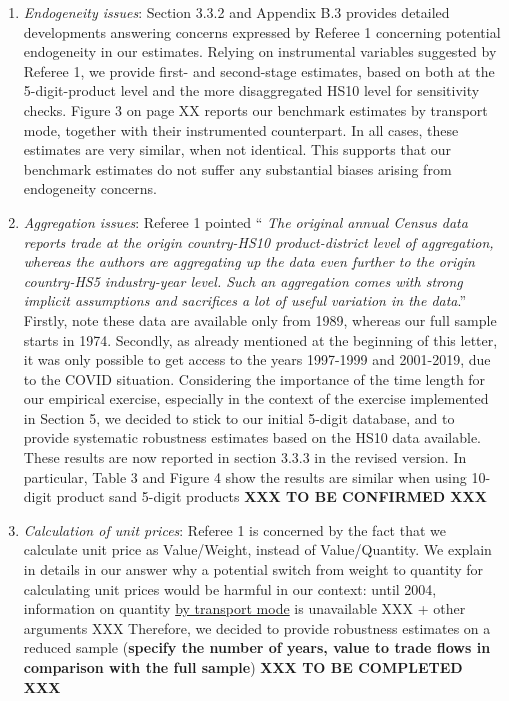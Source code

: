 \documentclass[12pt]{article}
\begin{document}
\begin{enumerate}


\item \emph{Endogeneity issues}: Section 3.3.2 and Appendix B.3 provides detailed developments answering concerns expressed by Referee 1 concerning potential endogeneity in our estimates. Relying on instrumental variables suggested by Referee 1, we provide first- and second-stage estimates, based on both at the 5-digit-product level and the more disaggregated HS10 level for sensitivity checks. Figure 3 on page XX reports our benchmark estimates by transport mode, together with their instrumented counterpart. In all cases, these estimates are very similar, when not identical. This supports that our benchmark estimates do not suffer any substantial biases arising from endogeneity concerns.
    
\item \emph{Aggregation issues}: Referee 1 pointed `` \emph{The original annual Census data reports trade at the origin country-HS10 product-district level of aggregation, whereas the authors are aggregating up the data even further to the origin country-HS5 industry-year level. Such an aggregation comes with strong implicit assumptions and sacrifices a lot of useful variation in the data}.'' Firstly, note these data are available only from 1989, whereas our full sample starts in 1974. Secondly, as already mentioned at the beginning of this letter, it was only possible to get access to the years 1997-1999 and 2001-2019, due to the COVID situation. Considering the importance of the time length for our empirical exercise, especially in the context of the exercise implemented in Section 5, we decided to stick to our initial 5-digit database, and to provide systematic robustness estimates based on the HS10 data available. These results are now reported in section 3.3.3 in the revised version. In particular, Table 3 and Figure 4 show the results are similar when using 10-digit product sand 5-digit products \textbf{XXX TO BE CONFIRMED XXX}
    
\item \emph{Calculation of unit prices}: Referee 1 is concerned by the fact that we calculate unit price as Value/Weight, instead of Value/Quantity. We explain in details in our answer why a potential switch from weight to quantity for calculating unit prices would be harmful in our context: until 2004, information on quantity \underline{by transport mode} is unavailable XXX + other arguments XXX Therefore, we decided to provide robustness estimates on a reduced sample (\textbf{specify the number of years, value to trade flows in comparison with the full sample}) \textbf{XXX TO BE COMPLETED XXX}




\end{enumerate}
\end{document}
